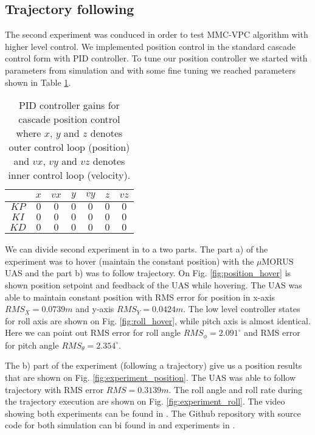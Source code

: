 \subsection{Trajectory following}

The second experiment was conduced in order to test MMC-VPC algorithm with higher level control. We implemented position control in the standard cascade control form with PID controller. To tune our position controller we started with parameters from simulation and with some fine tuning we reached parameters shown in Table \ref{table:position_control_params}. 

\begin{table}[h!]
\centering
\caption{PID controller gains for cascade position control where $x$, $y$ and $z$ denotes outer control loop (position) and $vx$, $vy$ and $vz$ denotes inner control loop (velocity).}
\label{table:position_control_params}
\begin{tabular}{|c|c|c|c|c|c|c|}
\hline
 & $x$ & $vx$ & $y$ & $vy$ & $z$ & $vz$\\
\hline
$KP$ & $0$ & $0$ & $0$ & $0$ & $0$ & $0$\\
\hline
$KI$ & $0$ & $0$ & $0$ & $0$ & $0$ & $0$\\
\hline
$KD$ & $0$ & $0$ & $0$ & $0$ & $0$ & $0$\\
\hline
\end{tabular}
\end{table}

We can divide second experiment in to a two parts. The part a) of the experiment was to hover (maintain the constant position) with the $\mu$MORUS UAS and the part b) was to follow trajectory. On Fig. \ref{fig:position_hover} is shown position setpoint and feedback of the UAS while hovering. The UAS was able to maintain constant position with RMS error for position in x-axis $RMS_X = 0.0739 m$ and y-axis $RMS_Y = 0.0424 m$. The low level controller states for roll axis are shown on Fig. \ref{fig:roll_hover}, while pitch axis is almost identical. Here we can point out RMS error for roll angle $RMS_\phi = 2.091^{\circ}$ and RMS error for pitch angle $RMS_\theta = 2.354^{\circ}$.

The b) part of the experiment (following a trajectory) give us a position results that are shown on Fig. \ref{fig:experiment_position}. The UAS was able to follow trajectory with RMS error $RMS = 0.3139 m$. The roll angle and roll rate during the trajectory execution are shown on Fig. \ref{fig:experiment_roll}. The video showing both experiments can be found in \cite{uMORUS2017video}. The Github repository with source code for both simulation can bi found in \cite{letaci2017} and experiments in \cite{letaciPixhawk2017}.
